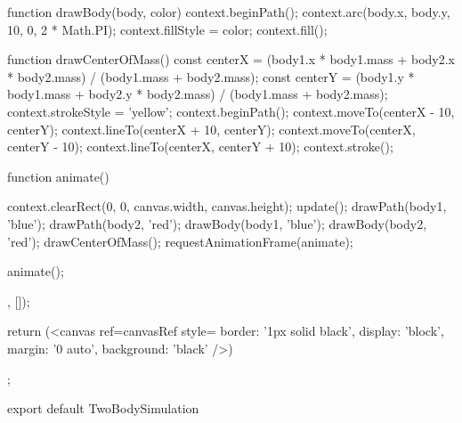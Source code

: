 \documentclass[a4paper,12pt,twoside]{article}
\begin{document}
\begin{javascript}
{{        function drawBody(body, color) {
            context.beginPath();
            context.arc(body.x, body.y, 10, 0, 2 * Math.PI);
            context.fillStyle = color;
            context.fill();
        }

        function drawCenterOfMass(){
            const centerX = (body1.x * body1.mass + body2.x * body2.mass) / (body1.mass + body2.mass);
            const centerY = (body1.y * body1.mass + body2.y * body2.mass) / (body1.mass + body2.mass);
            context.strokeStyle = 'yellow';
            context.beginPath();
            context.moveTo(centerX - 10, centerY);
            context.lineTo(centerX + 10, centerY);
            context.moveTo(centerX, centerY - 10);
            context.lineTo(centerX, centerY + 10);
            context.stroke();
        }

        function animate() {
        
            context.clearRect(0, 0, canvas.width, canvas.height);
            update();
            drawPath(body1, 'blue');
            drawPath(body2, 'red');
            drawBody(body1, 'blue');
            drawBody(body2, 'red');
            drawCenterOfMass();
            requestAnimationFrame(animate);
        }

        animate();
    }, []);



    return (<canvas ref={canvasRef} style={{ border: '1px solid black', display: 'block', margin: '0 auto', background: 'black' }} />)

};

export default TwoBodySimulation
\end{javascript}
\newpage
\end{document}
